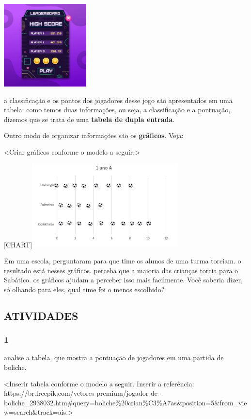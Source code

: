 \includegraphics[width=1.77083in,height=1.77083in]{media/image93.jpg}

a classificação e os pontos dos jogadores desse jogo são apresentados em
uma tabela. como temos duas informações, ou seja, a classificação e a
pontuação, dizemos que se trata de uma \textbf{tabela de dupla entrada}.

Outro modo de organizar informações são os \textbf{gráficos}. Veja:

\textless{}Criar gráficos conforme o modelo a seguir.\textgreater{}

{{[}CHART{]}}\includegraphics[width=3.13415in,height=1.79094in]{media/image94.png}

Em uma escola, perguntaram para que time os alunos de uma turma torciam. o
resultado está nesses gráficos. perceba que a maioria das crianças
torcia para o Sabático. os gráficos ajudam a perceber isso mais facilmente. Você saberia dizer, só olhando para eles, qual time foi o menos escolhido?

\subsection{ATIVIDADES}\label{atividades-6}

\subsubsection{1}\label{section-76}

analise a tabela, que mostra a pontuação de jogadores em uma partida de
boliche.

\textless{}Inserir tabela conforme o modelo a seguir. Inserir a
referência:
https://br.freepik.com/vetores-premium/jogador-de-boliche\_2938032.htm\#query=boliche\%20crian\%C3\%A7as\&position=5\&from\_view=search\&track=ais.\textgreater{}

